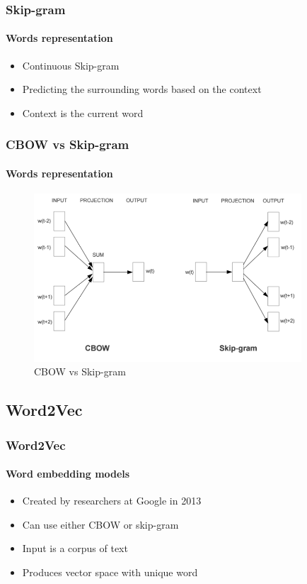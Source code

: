 \begin{frame}
\frametitle{Skip-gram}
	\framesubtitle{Words representation}

	\begin{itemize}
		\item Continuous Skip-gram
		\item Predicting the surrounding words based on the context
		\item Context is the current word
	\end{itemize}

\end{frame}


\begin{frame}
\frametitle{CBOW vs Skip-gram}
	\framesubtitle{Words representation}

	\begin{figure}
		\includegraphics[width=10cm]{./figures/cbow_skip_gram}
		\caption{CBOW vs Skip-gram}
	\end{figure}
	
\end{frame}


\subsection{Word2Vec}


\begin{frame}
\frametitle{Word2Vec}
	\framesubtitle{Word embedding models}

	\begin{itemize}
		\item Created by researchers at Google in 2013
		\item Can use either CBOW or skip-gram
		\item Input is a corpus of text
		\item Produces vector space with unique word 
	\end{itemize}

\end{frame}

